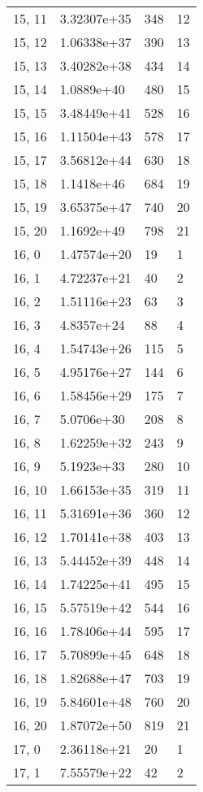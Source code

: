 \begin{table}
\begin{tabular}{llll}
15, 11 &  3.32307e+35 &  348 &    12 \\
15, 12 &  1.06338e+37 &  390 &    13 \\
15, 13 &  3.40282e+38 &  434 &    14 \\
15, 14 &   1.0889e+40 &  480 &    15 \\
15, 15 &  3.48449e+41 &  528 &    16 \\
15, 16 &  1.11504e+43 &  578 &    17 \\
15, 17 &  3.56812e+44 &  630 &    18 \\
15, 18 &   1.1418e+46 &  684 &    19 \\
15, 19 &  3.65375e+47 &  740 &    20 \\
15, 20 &   1.1692e+49 &  798 &    21 \\
16, 0  &  1.47574e+20 &   19 &     1 \\
16, 1  &  4.72237e+21 &   40 &     2 \\
16, 2  &  1.51116e+23 &   63 &     3 \\
16, 3  &   4.8357e+24 &   88 &     4 \\
16, 4  &  1.54743e+26 &  115 &     5 \\
16, 5  &  4.95176e+27 &  144 &     6 \\
16, 6  &  1.58456e+29 &  175 &     7 \\
16, 7  &   5.0706e+30 &  208 &     8 \\
16, 8  &  1.62259e+32 &  243 &     9 \\
16, 9  &   5.1923e+33 &  280 &    10 \\
16, 10 &  1.66153e+35 &  319 &    11 \\
16, 11 &  5.31691e+36 &  360 &    12 \\
16, 12 &  1.70141e+38 &  403 &    13 \\
16, 13 &  5.44452e+39 &  448 &    14 \\
16, 14 &  1.74225e+41 &  495 &    15 \\
16, 15 &  5.57519e+42 &  544 &    16 \\
16, 16 &  1.78406e+44 &  595 &    17 \\
16, 17 &  5.70899e+45 &  648 &    18 \\
16, 18 &  1.82688e+47 &  703 &    19 \\
16, 19 &  5.84601e+48 &  760 &    20 \\
16, 20 &  1.87072e+50 &  819 &    21 \\
17, 0  &  2.36118e+21 &   20 &     1 \\
17, 1  &  7.55579e+22 &   42 &     2 \\

\end{tabular}
\end{table}
